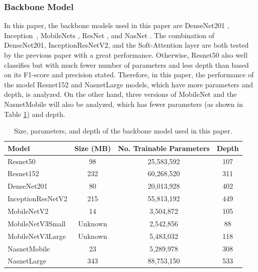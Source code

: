 \documentclass[sensors,article,accept,pdftex,moreauthors]{Definitions/mdpi}
\begin{document}
	\subsubsection{Backbone Model}
	In this paper, the backbone models used in this paper are DenseNet201 \cite{06993}, Inception~\cite{00567}, MobileNets \cite{04861,04381,02244}, ResNet \cite{03385,05027}, and NasNet \cite{07012}. The combination of DenseNet201, InceptionResNetV2, and the Soft-Attention layer are both tested by the previous paper \cite{03358} with a great performance. Otherwise, Resnet50 also well classifies but with much fewer number of parameters and less depth than based on its F1-score and precision stated. Therefore, in this paper, the performance of the model Resnet152 and NasnetLarge models, which have more parameters and depth, is analyzed. On the other hand, three versions of MobileNet and the NasnetMobile will also be analyzed, which has fewer parameters {(as shown in Table \mbox{\ref{table:model-summary}})} and depth. 
	
	\begin{table}[H]
		\caption{{Size}, parameters, and depth of the backbone model used in this paper.}%
		\label{table:model-summary}
		\setlength{\tabcolsep}{5.2mm}\begin{tabular}{l  c c c} 
\toprule
\textbf{Model} & \textbf{Size (MB)} & \textbf{No. Trainable Parameters} & \textbf{Depth} \\ 
\midrule
Resnet50 & 98 & 25,583,592 & 107 \\ 
\midrule
Resnet152 & 232 & 60,268,520 & 311 \\ 
\midrule
DenseNet201 & 80 & 20,013,928 & 402 \\
\midrule
InceptionResNetV2 & 215 & 55,813,192 & 449 \\
\midrule
MobileNetV2 & 14 & 3,504,872 & 105 \\ 
\midrule
MobileNetV3Small & Unknown & 2,542,856 & 88 \\ 
\midrule
MobileNetV3Large & Unknown & 5,483,032 & 118 \\
\midrule
NasnetMobile & 23 & 5,289,978 & 308 \\
\midrule
NasnetLarge & 343 & 88,753,150 & 533 \\ 
\bottomrule
		\end{tabular}
	\end{table}
	
\end{document}
